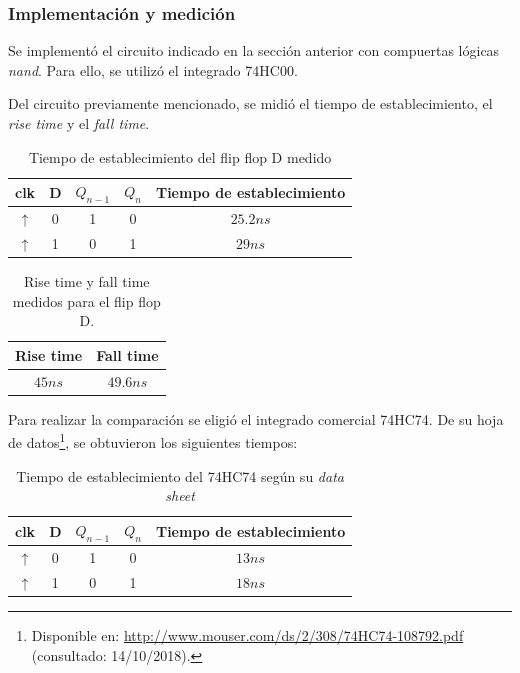 \documentclass[../../e3_tp2_main.tex]{subfiles}
\begin{document}
\subsubsection{Implementación y medici\'on}
Se implementó el circuito indicado en la sección anterior con compuertas lógicas \textit{nand}. Para ello, se utilizó el integrado 74HC00.\par

Del circuito previamente mencionado, se midió el tiempo de establecimiento, el \textit{rise time} y el \textit{fall time}. 

\begin{table}[H]
\begin{center}
\begin{tabular}{|c|c|c|c|c|}
\hline
clk& D & $Q_{n-1}$ & $Q_n$ &Tiempo de establecimiento\\
\hline \hline
$\uparrow$ &0& 1&0&$25.2 n s$  \\ \hline
$\uparrow$ &1&0&1&$29 n s$  \\ \hline
\end{tabular}
\caption{Tiempo de establecimiento del flip flop D medido} 
\end{center}
\end{table}

\begin{table}[H]
\begin{center}
\begin{tabular}{|c|c|}
\hline
Rise time& Fall time \\
\hline \hline
$45 n s$  & $49.6 n s$ \\ \hline
\end{tabular}
\caption{Rise time y fall time medidos para el flip flop D.} 
\end{center}
\end{table}

Para realizar la comparación se eligió el integrado comercial 74HC74. De su hoja de datos\footnote{Disponible en: \url{http://www.mouser.com/ds/2/308/74HC74-108792.pdf} (consultado: 14/10/2018).}, se obtuvieron los siguientes tiempos:

\begin{table}[H]
\begin{center}
\begin{tabular}{|c|c|c|c|c|}
\hline
clk& D & $Q_{n-1}$ & $Q_n$ &Tiempo de establecimiento\\
\hline \hline
$\uparrow$ &0& 1&0&$13 n s$  \\ \hline
$\uparrow$ &1&0&1&$18 n s$  \\ \hline
\end{tabular}
\caption{Tiempo de establecimiento del 74HC74 seg\'un su \textit{data sheet}} 
\end{center}
\end{table}
\end{document}
